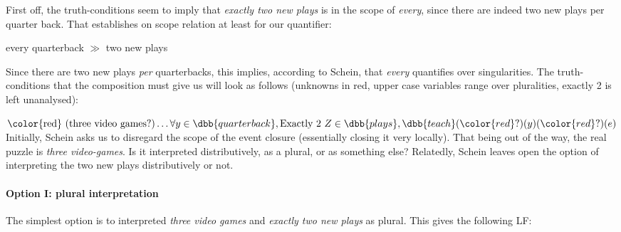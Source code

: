 \documentclass[english]{article}
\begin{document}
\ex \label{scenario}
\begin{center}
\end{center}
\xe
%


First off, the truth-conditions seem to imply that \emph{exactly two new plays} is in the scope of \emph{every}, since there are indeed two new plays per quarter back. That establishes on scope relation at least for our quantifier:

\begin{center}
every quarterback $\gg$ two new plays
\end{center}
%
Since there are two new plays \emph{per} quarterbacks, this implies, according to Schein, that \emph{every} quantifies over singularities. The truth-conditions that the composition must give us will look as follows (unknowns in red, upper case variables range over pluralities, exactly 2 is left unanalysed):

\ex
$\text{\color{red} (three video games?)} \ldots \forall y\in \dbb{quarterback}, \text{Exactly 2 } Z\in \dbb{plays},  \dbb{teach}({\color{red} ?})(y)({\color{red} ?})(e)$
\xe
%
Initially, Schein asks us to disregard the scope of the event closure (essentially closing it very locally). That being out of the way,
the real puzzle is \emph{three video-games}. Is it interpreted distributively, as a plural, or as something else? Relatedly, Schein leaves open the option of interpreting the two new plays distributively or not.

\paragraph{Option I: plural interpretation} The simplest option is to interpreted \emph{three video games} and \emph{exactly two new plays} as plural. This gives the following LF:
\end{document}
